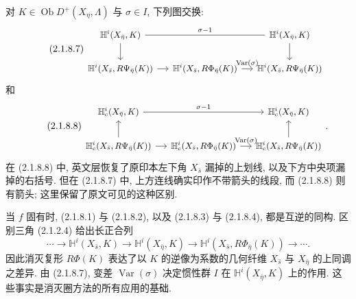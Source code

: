 对 $K\in\operatorname{Ob}D^+(X_\eta,\Lambda)$ 与 $\sigma\in I$, 下列图交换:
\begin{equation}\tag{2.1.8.7}
\begin{tikzcd}[column sep=small, cells={nodes={font=\small}}]
\mathbb H^i(X_{\bar\eta},K)
  \arrow[rr, dash, "\sigma-1"] \arrow[d]
  & {} & \mathbb H^i(X_{\bar\eta},K) \arrow[d] \\
\mathbb H^i(X_{\bar s},R\Psi_{\bar\eta}(K)) \arrow[r]
  & \mathbb H^i(X_{\bar s},R\Phi_{\bar\eta}(K))
      \arrow[r, "\operatorname{Var}(\sigma)"]
  & \mathbb H^i(X_{\bar s},R\Psi_{\bar\eta}(K))
\end{tikzcd}
\end{equation}
和
\begin{equation}\tag{2.1.8.8}
\begin{tikzcd}[column sep=small, cells={nodes={font=\small}}]
\mathbb H_c^i(X_{\bar\eta},K)
  \arrow[rr, "\sigma-1"]
  & {} & \mathbb H_c^i(X_{\bar\eta},K) \\
\mathbb H_c^i(X_{\bar s},R\Psi_{\bar\eta}(K)) \arrow[r] \arrow[u]
  & \mathbb H_c^i(X_{\bar s},R\Phi_{\bar\eta}(K))
      \arrow[r, "\operatorname{Var}(\sigma)"]
  & \mathbb H_c^i(X_{\bar s},R\Psi_{\bar\eta}(K)) \arrow[u]
\end{tikzcd}
.\end{equation}
在 (2.1.8.8) 中, 英文层恢复了原印本左下角 $X_{\bar s}$ 漏掉的上划线, 以及下方中央项漏掉的右括号. 但在 (2.1.8.7) 中, 上方连线确实印作不带箭头的线段, 而 (2.1.8.8) 则有箭头; 这里保留了原文可见的这种区别.

当 $f$ 固有时, (2.1.8.1) 与 (2.1.8.2), 以及 (2.1.8.3) 与 (2.1.8.4), 都是互逆的同构. 区别三角 (2.1.2.4) 给出长正合列
\begin{equation}\tag{2.1.8.9}
\cdots\longrightarrow\mathbb H^i(X_{\bar s},K)
\longrightarrow\mathbb H^i(X_{\bar\eta},K)
\longrightarrow\mathbb H^i(X_{\bar s},R\Phi_{\bar\eta}(K))
\longrightarrow\cdots.
\end{equation}
因此消灭复形 $R\Phi(K)$ 表达了以 $K$ 的逆像为系数的几何纤维 $X_{\bar s}$ 与 $X_{\bar\eta}$ 的上同调之差异. 由 (2.1.8.7), 变差 $\operatorname{Var}(\sigma)$ 决定惯性群 $I$ 在 $\mathbb H^i(X_{\bar\eta},K)$ 上的作用. 这些事实是消灭圈方法的所有应用的基础.
